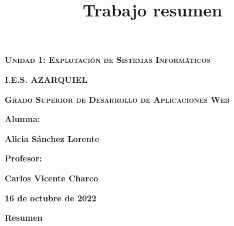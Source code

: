 \documentclass{book}
\title{Trabajo resumen}
\begin{document}
\frontmatter


\begin{titlepage}
    \begin{center}

        \vspace*{6\baselineskip} %

        {\scshape\Huge \textbf{Unidad 1: Explotación de Sistemas Informáticos } \par}

        \vspace{3cm}

        {\bfseries\LARGE I.E.S. AZARQUIEL }

        \vspace{1cm}

        {\scshape\Large  \textbf{Grado Superior de Desarrollo de Aplicaciones Web}\par}


        {\Large \textbf{Alumna:} \par}
        {\Large   \textbf{Alicia Sánchez Lorente} \par}
        {\Large  \textbf{Profesor:} \par}
        {\Large  \textbf {Carlos Vicente Charco}\par}
        \vfill
        {\Large  \textbf{16 de octubre de 2022} \par}

    \end{center}
\end{titlepage}

\shipout\null

\newpage

\begin{center}
    \textbf{\LARGE Resumen}
\end{center}
\end{document}
